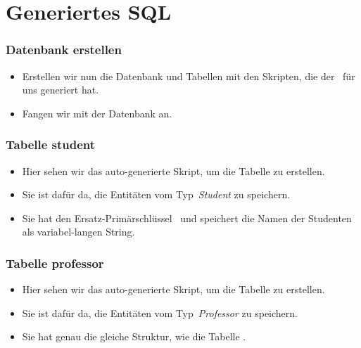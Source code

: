 \documentclass[aspectratio=169,mathserif,notheorems]{beamer}%
\begin{document}
\section{Generiertes SQL}%
%
\begin{frame}[t]%
\frametitle{Datenbank erstellen}%
\begin{itemize}%
\item Erstellen wir nun die Datenbank und Tabellen mit den Skripten, die der \pgmodeler\ für uns generiert hat.%
%
\item<2-> Fangen wir mit der Datenbank an.
\end{itemize}%
%
%
%
%
\end{frame}%
%
\begin{frame}[t]%
\frametitle{Tabelle student}%
\parbox{0.435\linewidth}{\small%
\begin{itemize}%
%
\item Hier sehen wir das auto-generierte Skript, um die Tabelle  zu erstellen.%
%
\item<2-> Sie ist dafür da, die Entitäten vom Typ~\emph{Student} zu speichern.%
%
\item<3-> Sie hat den Ersatz-Primärschlüssel~ und speichert die Namen der Studenten als variabel-langen String.%
%
\end{itemize}%
}%
%
\end{frame}%
%
\begin{frame}[t]%
\frametitle{Tabelle professor}%
\parbox{0.435\linewidth}{\small%
\begin{itemize}%
%
\item Hier sehen wir das auto-generierte Skript, um die Tabelle  zu erstellen.%
%
\item<2-> Sie ist dafür da, die Entitäten vom Typ~\emph{Professor} zu speichern.%
%
\item<3-> Sie hat genau die gleiche Struktur, wie die Tabelle .%
%
\end{itemize}%
}%
%
\end{frame}%
\end{document}
